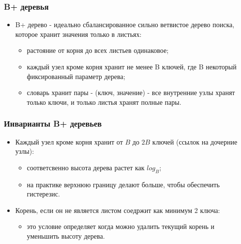 \begin{frame}
\frametitle{B+ деревья}
\begin{itemize}
  \item B+ дерево - идеально сбалансированное сильно ветвистое дерево
  поиска, которое хранит значения только в листьях:
  \begin{itemize}
    \item растояние от корня до всех листьев одинаковое;
    \item каждый узел кроме корня хранит не менее B ключей, где B
    некоторый фиксированный параметр дерева;
    \item словарь хранит пары - (ключ, значение) - все внутренние узлы
    хранят только ключи, и только листья хранят полные пары.
  \end{itemize}
\end{itemize}
\end{frame}

\begin{frame}
\frametitle{Инварианты B+ деревьев}
\begin{itemize}
  \item Каждый узел кроме корня хранит от $B$ до $2B$ ключей (ссылок на
  дочерние узлы):
  \begin{itemize}
    \item соответсвенно высота дерева растет как $log_B$;
    \item на практике верхнюю границу делают больше, чтобы обеспечить
    гистерезис.
  \end{itemize}
  \item Корень, если он не является листом соедржит как минимум 2 ключа:
  \begin{itemize}
    \item это условие определяет когда можно удалить текущий корень и уменьшить 
    высоту дерева.
  \end{itemize}
\end{itemize}
\end{frame}

